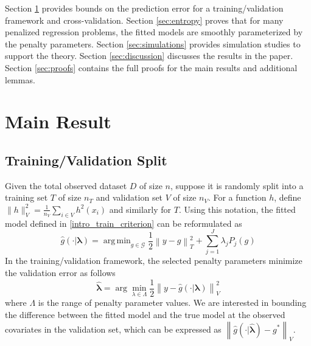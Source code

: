 \documentclass[12pt]{article}
\DeclareMathOperator*{\argmin}{arg\,min}
\begin{document}
Section \ref{sec:main_results} provides bounds on the prediction error for a training/validation framework and cross-validation.
Section \ref{sec:entropy} proves that for many penalized regression problems, the fitted models are smoothly parameterized by the penalty parameters.
Section \ref{sec:simulations} provides simulation studies to support the theory.
Section \ref{sec:discussion} discusses the results in the paper.
Section \ref{sec:proofs} contains the full proofs for the main results and additional lemmas.

\section{Main Result} \label{sec:main_results}

\subsection{Training/Validation Split}

Given the total observed dataset $D$ of size $n$, suppose it is randomly split into a training set $T$ of size $n_T$ and validation set $V$ of size $n_V$. For a function $h$, define $\| h \|_V^2 = \frac{1}{n_V}\sum_{i\in V} h^2(x_i)$ and similarly for $T$. Using this notation, the fitted model defined in  \eqref{intro_train_criterion} can be reformulated as
\begin{equation}
\hat{g}(\cdot | \boldsymbol \lambda) = \argmin_{g\in \mathcal{G}} \frac{1}{2} \left \|y -  g \right \|_T^2 + \sum_{j=1}^J \lambda_j P_j(g)
\end{equation}
In the training/validation framework, the selected penalty parameters minimize the validation error as follows
\begin{equation}
\label{cv_lambda}
\hat{\boldsymbol \lambda} = \arg\min_{\lambda\in\Lambda} \frac{1}{2} \left \| y-\hat{g}(\cdot | \boldsymbol \lambda) \right \|_{V}^{2}
\end{equation}  
where $\Lambda$ is the range of penalty parameter values. We are interested in bounding the difference between the fitted model and the true model at the observed covariates in the validation set, which can be expressed as $\left \|\hat{g}(\cdot | \hat{\boldsymbol \lambda}) - g^* \right \|_V$. 
\end{document}
